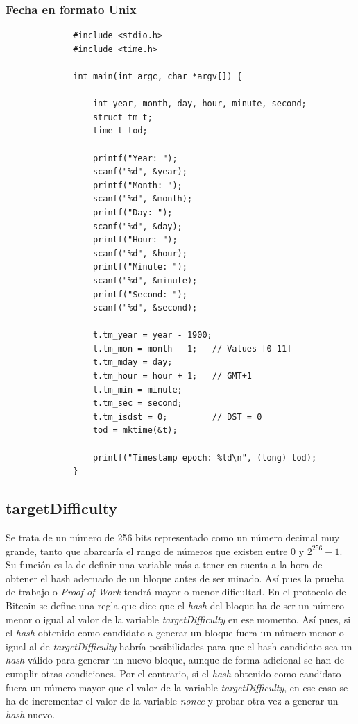 \documentclass{article}
\begin{document}
        \subsubsection{Fecha en formato Unix}
        \begin{figure}[H]
        \centering
            \begin{verbatim}
        #include <stdio.h>
        #include <time.h>
        
        int main(int argc, char *argv[]) {
        
        	int year, month, day, hour, minute, second;
        	struct tm t;
        	time_t tod;
        
        	printf("Year: ");
        	scanf("%d", &year);
        	printf("Month: ");
        	scanf("%d", &month);
        	printf("Day: ");
        	scanf("%d", &day);
        	printf("Hour: ");
        	scanf("%d", &hour);
        	printf("Minute: ");
        	scanf("%d", &minute);
        	printf("Second: ");
        	scanf("%d", &second);
        
        	t.tm_year = year - 1900;
        	t.tm_mon = month - 1;   // Values [0-11]
        	t.tm_mday = day;
        	t.tm_hour = hour + 1;   // GMT+1
        	t.tm_min = minute;
        	t.tm_sec = second;
        	t.tm_isdst = 0;         // DST = 0
        	tod = mktime(&t);
        
        	printf("Timestamp epoch: %ld\n", (long) tod);
        }
            \end{verbatim}
        \end{figure}
    
    \subsection{targetDifficulty}
    Se trata de un número de 256 bits representado como un número decimal muy grande, tanto que abarcaría el rango de números que existen entre $0$ y $2^{256}-1$. Su función es la de definir una variable más a tener en cuenta a la hora de obtener el hash adecuado de un bloque antes de ser minado. Así pues la prueba de trabajo o \textit{Proof of Work} tendrá mayor o menor dificultad. En el protocolo de Bitcoin se define una regla que dice que el \textit{hash} del bloque ha de ser un número menor o igual al valor de la variable \textit{targetDifficulty} en ese momento. Así pues, si el \textit{hash} obtenido como candidato a generar un bloque fuera un número menor o igual al de \textit{targetDifficulty} habría posibilidades para que el hash candidato sea un \textit{hash} válido para generar un nuevo bloque, aunque de forma adicional se han de cumplir otras condiciones. Por el contrario, si el \textit{hash} obtenido como candidato fuera un número mayor que el valor de la variable \textit{targetDifficulty}, en ese caso se ha de incrementar el valor de la variable \textit{nonce} y probar otra vez a generar un \textit{hash} nuevo.
    
\end{document}
